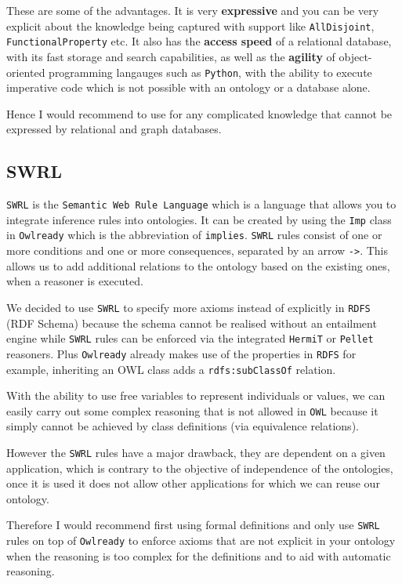 \documentclass{article}
\begin{document}
These are some of the advantages. It is very \textbf{expressive} and you can be very explicit about the knowledge being captured with support like \verb|AllDisjoint|, \verb|FunctionalProperty| etc. It also has the \textbf{access speed} of a relational database, with its fast storage and search capabilities, as well as the \textbf{agility} of object-oriented programming langauges such as \verb|Python|, with the ability to execute imperative code which is not possible with an ontology or a database alone.

Hence I would recommend to use for any complicated knowledge that cannot be expressed by relational and graph databases.
\subsection*{SWRL}
\verb|SWRL| is the \verb|Semantic Web Rule Language| which is a language that allows you to integrate inference rules into ontologies. It can be created by using the \verb|Imp| class in \verb|Owlready| which is the abbreviation of \verb|implies|. \verb|SWRL| rules consist of one or more conditions and one or more consequences, separated by an arrow \verb|->|. This allows us to add additional relations to the ontology based on the existing ones, when a reasoner is executed.

We decided to use \verb|SWRL| to specify more axioms instead of explicitly in \verb|RDFS| (RDF Schema) because the schema cannot be realised without an entailment engine while \verb|SWRL| rules can be enforced via the integrated \verb|HermiT| or \verb|Pellet| reasoners. Plus \verb|Owlready| already makes use of the properties in \verb|RDFS| for example, inheriting an OWL class adds a \verb|rdfs:subClassOf| relation.

With the ability to use free variables to represent individuals or values, we can easily carry out some complex reasoning that is not allowed in \verb|OWL| because it simply cannot be achieved by class definitions (via equivalence relations).

However the \verb|SWRL| rules have a major drawback, they are dependent on a given application, which is contrary to the objective of independence of the ontologies, once it is used it does not allow other applications for which we can reuse our ontology.

Therefore I would recommend first using formal definitions and only use \verb|SWRL| rules on top of \verb|Owlready| to enforce axioms that are not explicit in your ontology when the reasoning is too complex for the definitions and to aid with automatic reasoning.
\end{document}

